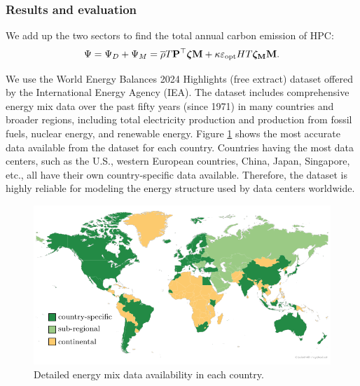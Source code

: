 \documentclass[12pt]{article}
\begin{document}
\subsubsection{Results and evaluation}

We add up the two sectors to find the total annual carbon emission of HPC:
\begin{equation}
	\Psi = \Psi_D + \Psi_M
	= \overline{\rho} T \vb{P}^\top \boldsymbol{\zeta} \vb{M}
		+ \kappa \varepsilon_{\rm opt} HT \boldsymbol{\rm \zeta_M} \vb{M}.
\end{equation}

We use the World Energy Balances 2024 Highlights (free extract) dataset \citep{energy_mix_dataset} offered by the International Energy Agency (IEA). The dataset includes comprehensive energy mix data over the past fifty years (since 1971) in many countries and broader regions, including total electricity production and production from fossil fuels, nuclear energy, and renewable energy. Figure \ref{fig_emission_data_availability} shows the most accurate data available from the dataset for each country. Countries having the most data centers, such as the U.S., western European countries, China, Japan, Singapore, etc., all have their own country-specific data available. Therefore, the dataset is highly reliable for modeling the energy structure used by data centers worldwide.

\begin{figure}[t]
	\centering
	\includegraphics{figures/data/emission_map.pdf}
	\vspace*{-0.5cm}
	\caption{Detailed energy mix data availability in each country.}
	\label{fig_emission_data_availability}
\end{figure}
\end{document}
